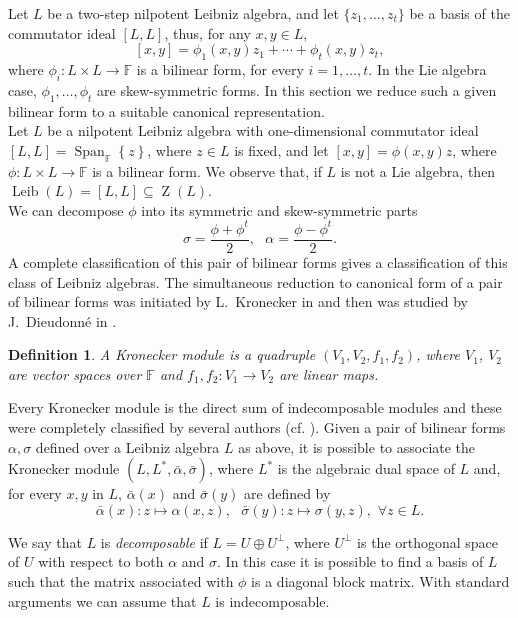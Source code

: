 \documentclass[english,4paper,10pt]{article}
\newcommand{\F}{\mathbb{F}}
\newtheorem{definition}[thm]{Definition}
\begin{document}
Let $L$ be a two-step nilpotent Leibniz algebra, and let $\lbrace z_1,\ldots,z_t\rbrace$ be a basis of the commutator ideal $[L,L]$, thus, for any $x,y\in L$,
$$
[x,y]=\phi_1(x,y)z_1+\cdots+\phi_t(x,y)z_t,
$$
where $\phi_i\colon L\times L\rightarrow \F$ is a bilinear form, for every $i=1,\ldots,t$. In the Lie algebra case, $\phi_1,\ldots,\phi_t$ are skew-symmetric forms.
In this section we reduce such a given bilinear form to a suitable canonical representation.\\

Let $L$ be a nilpotent Leibniz algebra with one-dimensional commutator ideal $\left[L,L\right]=\operatorname{Span}_\F\left\{z\right\}$, where $z \in L$ is fixed, and let $\left[x,y\right]=\phi(x,y)z$, where $\phi:L\times L\rightarrow \F$ is a bilinear form. We observe that, if $L$ is not a Lie algebra, then  $\operatorname{Leib}(L)=[L,L] \subseteq \operatorname{Z}(L)$.\\

	We can decompose $\phi$ into its symmetric and skew-symmetric parts
	$$
	\sigma=\dfrac{\phi+\phi^t}{2},\,\,\,\, \alpha=\dfrac{\phi-\phi^t}{2}.
	$$
	A complete classification of this pair of bilinear forms gives a classification of this class of Leibniz algebras. 
	The simultaneous reduction to canonical form of a pair of bilinear forms was initiated by L.\ Kronecker in \cite{kronecker1890algebraische} and then was studied by J.\ Dieudonné in \cite{Dieudonné}.
	
	\begin{definition} 
	A Kronecker module is a quadruple $\left(V_1,V_2,f_1,f_2\right)$, where $V_1$, $V_2$ are vector spaces over $\F$ and $f_1,f_2\colon V_1\rightarrow V_2$ are linear maps.
	\end{definition}

Every Kronecker module is the  direct sum of indecomposable modules and these were completely classified by several authors (cf. \cite{Falcone2004}). Given a pair of bilinear forms $\alpha,\sigma$ defined over a Leibniz algebra $L$ as above, it is possible to associate the Kronecker module $\left(L,L^*,\bar{\alpha},\bar{\sigma}\right)$, where $L^*$ is the algebraic dual space of $L$ and, for every $x,y$ in $L$, $\bar{\alpha}(x)$ and $\bar{\sigma}(y)$ are defined by
$$
\bar{\alpha}(x)\colon z\mapsto \alpha(x,z),\,\,\,\,\bar{\sigma}(y)\colon z\mapsto \sigma(y,z), \,\, \forall z\in L.
$$ 

We say that $L$ is \emph{decomposable} if $L = U\oplus U^\perp$, where $U^\perp$ is the orthogonal space of $U$ with respect to both $\alpha$ and $\sigma$. In this case it is possible to find a basis of $L$ such that the matrix associated with $\phi$ is a diagonal block matrix. With standard arguments we can assume that $L$ is indecomposable.\\
\end{document}
